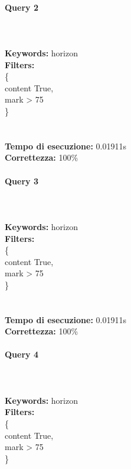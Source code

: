\documentclass[12pt]{book}
\begin{document}
\paragraph{Query 2} ~ \\ \\

\noindent \textbf{Keywords: } horizon \\
\textbf{Filters: } \\
\indent \{ \\
\indent \indent content True, \\
\indent \indent mark > 75 \\
\indent \} \\\\\\


\noindent
\textbf{Tempo di esecuzione:} 0.01911s \\
\textbf{Correttezza:} 100\%

\paragraph{Query 3} ~ \\ \\

\noindent \textbf{Keywords: } horizon \\
\textbf{Filters: } \\
\indent \{ \\
\indent \indent content True, \\
\indent \indent mark > 75 \\
\indent \} \\\\\\


\noindent
\textbf{Tempo di esecuzione:} 0.01911s \\
\textbf{Correttezza:} 100\%

\paragraph{Query 4} ~ \\ \\

\noindent \textbf{Keywords: } horizon \\
\textbf{Filters: } \\
\indent \{ \\
\indent \indent content True, \\
\indent \indent mark > 75 \\
\indent \} \\\\\\
\end{document}

